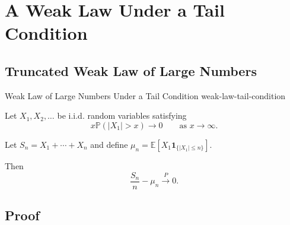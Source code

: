 
\section{A Weak Law Under a Tail Condition}

\subsection{Truncated Weak Law of Large Numbers}

\begin{theorem}{Weak Law of Large Numbers Under a Tail Condition}
{weak-law-tail-condition}

Let
\(
X_1,X_2,\ldots
\)
be i.i.d. random variables satisfying
\[
x\mathbb{P}(|X_1|>x)
\longrightarrow0
\qquad
\text{as }x\to\infty.
\]

Let
\(
S_n
=
X_1+\cdots+X_n
\)
and define
\(
\mu_n
=
\mathbb{E}
\left[
X_1
\mathbf{1}_{\{|X_1|\leq n\}}
\right].
\)

Then
\[
\boxed{
\frac{S_n}{n}-\mu_n
\xrightarrow{P}0.
}
\]

\end{theorem}


\subsection{Proof}

